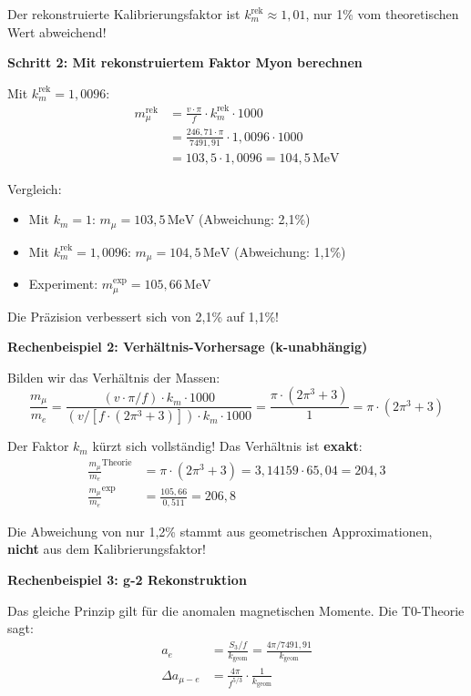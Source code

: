 	Der rekonstruierte Kalibrierungsfaktor ist \(k_m^{\text{rek}} \approx 1{,}01\), nur 1\% vom theoretischen Wert abweichend!
	
	\textbf{Schritt 2: Mit rekonstruiertem Faktor Myon berechnen}
	
	Mit \(k_m^{\text{rek}} = 1{,}0096\):
	\begin{align}
		m_\mu^{\text{rek}} &= \frac{v \cdot \pi}{f} \cdot k_m^{\text{rek}} \cdot 1000 \\
		&= \frac{246{,}71 \cdot \pi}{7491{,}91} \cdot 1{,}0096 \cdot 1000 \\
		&= 103{,}5 \cdot 1{,}0096 = 104{,}5\,\text{MeV}
	\end{align}
	
	Vergleich:
	\begin{itemize}
		\item Mit \(k_m = 1\): \(m_\mu = 103{,}5\,\text{MeV}\) (Abweichung: 2{,}1\%)
		\item Mit \(k_m^{\text{rek}} = 1{,}0096\): \(m_\mu = 104{,}5\,\text{MeV}\) (Abweichung: 1{,}1\%)
		\item Experiment: \(m_\mu^{\exp} = 105{,}66\,\text{MeV}\)
	\end{itemize}
	
	Die Präzision verbessert sich von 2{,}1\% auf 1{,}1\%!
	
	\textbf{Rechenbeispiel 2: Verhältnis-Vorhersage (k-unabhängig)}
	
	Bilden wir das Verhältnis der Massen:
	\begin{equation}
		\frac{m_\mu}{m_e} = \frac{(v \cdot \pi / f) \cdot k_m \cdot 1000}{(v / [f \cdot (2\pi^3 + 3)]) \cdot k_m \cdot 1000} = \frac{\pi \cdot (2\pi^3 + 3)}{1} = \pi \cdot (2\pi^3 + 3)
	\end{equation}
	
	Der Faktor \(k_m\) kürzt sich vollständig! Das Verhältnis ist \textbf{exakt}:
	\begin{align}
		\frac{m_\mu}{m_e}^{\text{Theorie}} &= \pi \cdot (2\pi^3 + 3) = 3{,}14159 \cdot 65{,}04 = 204{,}3 \\
		\frac{m_\mu}{m_e}^{\exp} &= \frac{105{,}66}{0{,}511} = 206{,}8
	\end{align}
	
	Die Abweichung von nur 1{,}2\% stammt aus geometrischen Approximationen, \textbf{nicht} aus dem Kalibrierungsfaktor!
	
	\textbf{Rechenbeispiel 3: g-2 Rekonstruktion}
	
	Das gleiche Prinzip gilt für die anomalen magnetischen Momente. Die T0-Theorie sagt:
	\begin{align}
		a_e &= \frac{S_3/f}{k_{\text{geom}}} = \frac{4\pi/7491{,}91}{k_{\text{geom}}} \\
		\Delta a_{\mu-e} &= \frac{4\pi}{f^{5/3}} \cdot \frac{1}{k_{\text{geom}}}
	\end{align}
	
